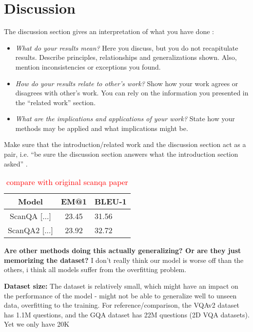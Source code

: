 %
\newpage
\chapter{Discussion}
The discussion section gives an interpretation of what you have done \cite{day2006wap}:

\begin{itemize}
 \item \textit{What do your results mean?} Here you discuss, but you do not recapitulate results. Describe principles, relationships and generalizations shown. Also, mention inconsistencies or exceptions you found.
 \item \textit{How do your results relate to other's work?} Show how your work agrees or disagrees with other's work. You can rely on the information you presented in the ``related work'' section.
 \item \textit{What are the implications and applications of your work?} State how your methods may be applied and what implications might be. 
\end{itemize}

\noindent Make sure that the introduction/related work and the discussion section act as a pair, i.e. ``be sure the discussion section answers what the introduction section asked'' \cite{day2006wap}.

\begin{table}[h!]
    \centering
    \caption{\textcolor{red}{compare with original scanqa paper}}
    \begin{tabular}{|c|c|l|}
    \hline
    \textbf{Model}    & \textbf{EM@1} & \textbf{BLEU-1} \\ \hline
    ScanQA {[}...{]}  &  23.45        &  31.56          \\ \hline
    ScanQA2 {[}...{]} &  23.92        &  32.72          \\ \hline
    \end{tabular}
    \end{table}

\textbf{Are other methods doing this actually generalizing? Or are they just memorizing the dataset?} I don't really think our model is worse off than the others, i think all models suffer from the overfitting problem.

\textbf{Dataset size:} The dataset is relatively small, which might have an impact on the performance of the model - might not be able to generalize well to unseen data, overfitting to the training. 
For reference/comparison, the VQAv2 dataset has 1.1M questions, and the GQA dataset has 22M questions (2D VQA datasets). Yet we only have 20K


